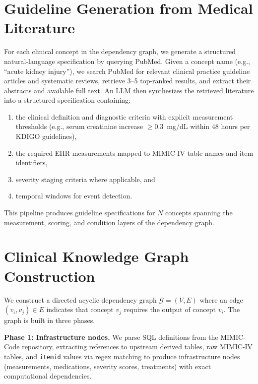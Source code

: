 
\section{Guideline Generation from Medical Literature}
\label{app:guideline_gen}

For each clinical concept in the dependency graph, we generate a structured natural-language specification by querying PubMed. Given a concept name (e.g., ``acute kidney injury''), we search PubMed for relevant clinical practice guideline articles and systematic reviews, retrieve 3--5 top-ranked results, and extract their abstracts and available full text. An LLM then synthesizes the retrieved literature into a structured specification containing:
\begin{enumerate}[label=(\roman*),nosep]
    \item the clinical definition and diagnostic criteria with explicit measurement thresholds (e.g., serum creatinine increase $\geq 0.3$~mg/dL within 48 hours per KDIGO guidelines),
    \item the required EHR measurements mapped to MIMIC-IV table names and item identifiers,
    \item severity staging criteria where applicable, and
    \item temporal windows for event detection.
\end{enumerate}
This pipeline produces guideline specifications for $N$ concepts spanning the measurement, scoring, and condition layers of the dependency graph.

\section{Clinical Knowledge Graph Construction}
\label{app:knowledge_graph}

We construct a directed acyclic dependency graph $\mathcal{G} = (V, E)$ where an edge $(v_i, v_j) \in E$ indicates that concept $v_j$ requires the output of concept $v_i$. The graph is built in three phases.

\textbf{Phase 1: Infrastructure nodes.} We parse SQL definitions from the MIMIC-Code repository, extracting references to upstream derived tables, raw MIMIC-IV tables, and \texttt{itemid} values via regex matching to produce infrastructure nodes (measurements, medications, severity scores, treatments) with exact computational dependencies.


